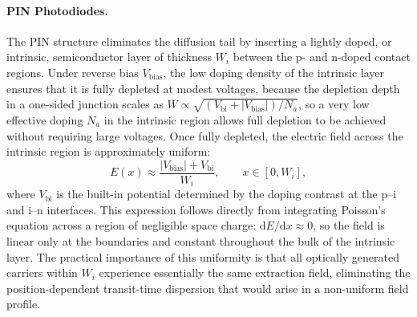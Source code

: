 \paragraph{PIN Photodiodes.}
The PIN structure eliminates the diffusion tail by inserting a lightly doped,
or intrinsic, semiconductor layer of thickness $W_i$ between the p- and n-doped
contact regions. Under reverse bias $V_{\mathrm{bias}}$, the low doping density
of the intrinsic layer ensures that it is fully depleted at modest voltages,
because the depletion depth in a one-sided junction scales as
$W \propto \sqrt{(V_{\mathrm{bi}}+|V_{\mathrm{bias}}|)/N_a}$, so a very low
effective doping $N_a$ in the intrinsic region allows full depletion to be
achieved without requiring large voltages. Once fully depleted, the electric
field across the intrinsic region is approximately uniform:
\begin{equation}
    E(x) \approx \frac{|V_{\mathrm{bias}}|+V_{\mathrm{bi}}}{W_i},
    \qquad x\in[0,W_i],
    \label{eq:pin_efield_uniform}
\end{equation}
where $V_{\mathrm{bi}}$ is the built-in potential determined by the doping
contrast at the p--i and i--n interfaces. This expression follows directly from
integrating Poisson's equation across a region of negligible space charge:
$\mathrm{d}E/\mathrm{d}x \approx 0$, so the field is linear only at the
boundaries and constant throughout the bulk of the intrinsic layer. The
practical importance of this uniformity is that all optically generated
carriers within $W_i$ experience essentially the same extraction field,
eliminating the position-dependent transit-time dispersion that would
arise in a non-uniform field profile.

